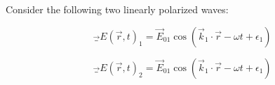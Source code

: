 \documentclass[12pt]{article}
\begin{document}
Consider the following two linearly polarized waves:

$$
\vec_{E}(\vec{r}, t)_{1} = \vec{E}_{01} \cos(\vec{k}_{1} \cdot \vec{r} - \omega t + \epsilon_{1})
$$

$$
\vec_{E}(\vec{r}, t)_{2} = \vec{E}_{01} \cos(\vec{k}_{1} \cdot \vec{r} - \omega t + \epsilon_{1})
$$
\end{document}
